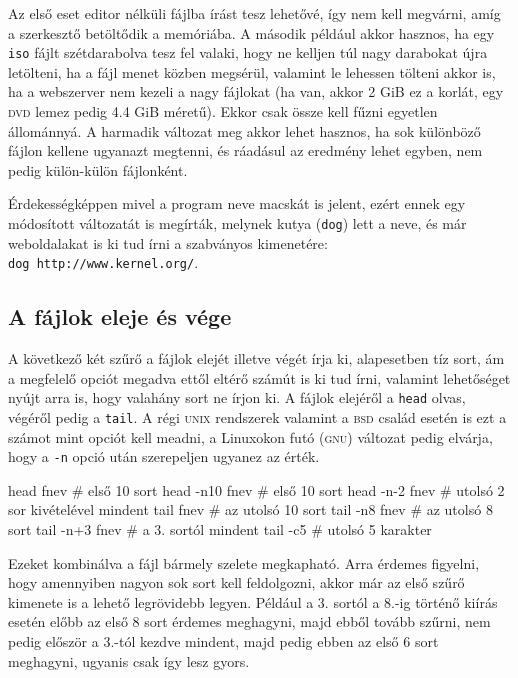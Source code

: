 Az első eset editor nélküli fájlba írást tesz lehetővé, így nem kell megvárni,
amíg a szerkesztő betöltődik a memóriába. A második például akkor hasznos, ha
egy \texttt{iso} fájlt szétdarabolva tesz fel valaki, hogy ne kelljen túl nagy
darabokat újra letölteni, ha a fájl menet közben megsérül, valamint le lehessen
tölteni akkor is, ha a webszerver nem kezeli a nagy fájlokat (ha van, akkor 2
GiB ez a korlát, 
egy \textsc{dvd} lemez pedig 4.4 GiB méretű).  Ekkor csak össze kell fűzni
egyetlen állománnyá. A harmadik változat meg akkor lehet hasznos, ha sok
különböző fájlon kellene ugyanazt megtenni, és ráadásul az eredmény lehet
egyben, nem pedig külön-külön fájlonként.

Érdekességképpen mivel a program neve macskát is jelent, ezért ennek egy
módosított változatát is megírták, melynek kutya (\texttt{dog}) lett a neve, és
már weboldalakat is ki tud írni a szabványos kimenetére:\\
\texttt{dog http://www.kernel.org/}.

\subsection{A fájlok eleje és vége}

A következő két szűrő a fájlok elejét illetve végét írja ki, alapesetben tíz
sort, ám a megfelelő opciót megadva ettől eltérő számút is ki tud írni, valamint
lehetőséget nyújt arra is, hogy valahány sort ne írjon ki. A fájlok elejéről a
\texttt{head} olvas, végéről pedig a \texttt{tail}. A régi \textsc{unix}
rendszerek valamint a \textsc{bsd} család esetén is ezt a számot mint opciót
kell meadni, a Linuxokon futó (\textsc{gnu}) változat pedig elvárja, hogy a
\texttt{-n} opció után szerepeljen ugyanez az érték.

\begin{VerbExample}
head fnev       # első 10 sort
head -n10 fnev  # első 10 sort
head -n-2 fnev  # utolsó 2 sor kivételével mindent
tail fnev       # az utolsó 10 sort
tail -n8 fnev   # az utolsó 8 sort
tail -n+3 fnev  # a 3. sortól mindent
tail -c5        # utolsó 5 karakter 
\end{VerbExample}

Ezeket kombinálva a fájl bármely szelete megkapható. Arra érdemes figyelni, hogy
amennyiben nagyon sok sort kell feldolgozni, akkor már az első szűrő kimenete is
a lehető legrövidebb legyen. Például a 3. sortól a 8.-ig történő kiírás esetén
előbb az első 8 sort érdemes meghagyni, majd ebből tovább szűrni, nem pedig
először a 3.-tól kezdve mindent, majd pedig ebben az első 6 sort meghagyni,
ugyanis csak így lesz gyors.

